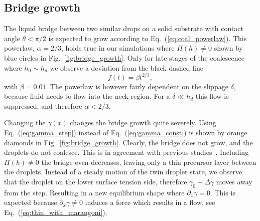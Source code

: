 \documentclass[twocolumn,amsmath,amssymb,showpacs,pre,nofootinbib,superscriptaddress]{revtex4-1} %
\begin{document}
\subsection{Bridge growth}\label{subsec:growth}
The liquid bridge between two similar drops on a solid substrate with contact angle $\theta < \pi/2$ is expected to grow according to Eq.~(\ref{eq:coal_powerlaw}). 
This powerlaw, $\alpha = 2/3$, holds true in our simulations where $\Pi(h) \neq 0$ shown by blue circles in Fig.~\ref{fig:bridge_growth}.
Only for late stages of the coalescence where $h_0 \sim h_d$ we observe a deviation from the black dashed line 
\begin{equation}\label{eq:fit_powerlaw}
    f(t) = \beta t^{2/3},
\end{equation}
with $\beta = 0.01$.
The powerlaw is however fairly dependent on the slippage $\delta$, because fluid needs to flow into the neck region.
For a $\delta \ll h_d$ this flow is suppressed, and therefore $\alpha < 2/3$.
 
Changing the $\gamma(x)$ changes the bridge growth quite severely.
Using Eq.~(\ref{eq:gamma_step}) instead of Eq.~(\ref{eq:gamma_const}) is shown by orange diamonds in Fig.~\ref{fig:bridge_growth}.
Clearly, the bridge does not grow, and the droplets do not coalesce.
This is in agreement with previous studies~\cite{karpitschka2014sharp, doi:10.1021/la500459v, PhysRevLett.109.066103, doi:10.1021/la800630w}. 
Including $\Pi(h) \neq 0$ the bridge even decreases, leaving only a thin precursor layer between the droplets.
Instead of a steady motion of the twin droplet state, we observe that the droplet on the lower surface tension side, therefore $\gamma_0 - \Delta\gamma$ moves away from the step. 
Resulting in a new equilibrium shape where $\partial_x\gamma = 0$.
This is expected because $\partial_x\gamma\neq 0$ induces a force which results in a flow, see Eq.~(\ref{eq:thin_with_marangoni}).
\end{document}
